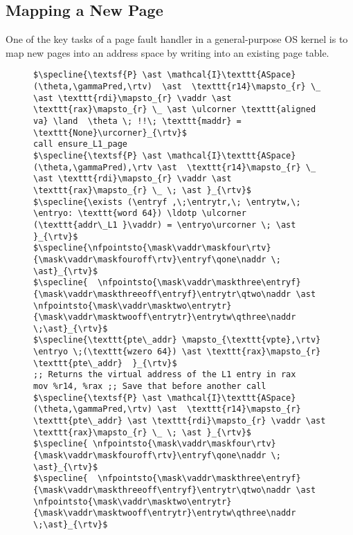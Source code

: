 \subsection{Mapping a New Page}
One of the key tasks of a page fault handler in a general-purpose OS kernel is to map new pages into an address space by writing into an existing page table.
\newcommand{\fpaddr}{\texttt{fpaddr}}
\newcommand{\specline}[1]{{\color{blue}\left\{#1\right\}}}
\begin{figure}\footnotesize
  \begin{lstlisting}
$\specline{\textsf{P} \ast \mathcal{I}\texttt{ASpace}(\theta,\gammaPred,\rtv)  \ast  \texttt{r14}\mapsto_{r} \_ \ast \texttt{rdi}\mapsto_{r} \vaddr \ast \texttt{rax}\mapsto_{r} \_ \ast \ulcorner \texttt{aligned va} \land  \theta \; !!\; \texttt{maddr} = \texttt{None}\urcorner}_{\rtv}$
call ensure_L1_page
$\specline{\textsf{P} \ast \mathcal{I}\texttt{ASpace}(\theta,\gammaPred),\rtv \ast  \texttt{r14}\mapsto_{r} \_ \ast \texttt{rdi}\mapsto_{r} \vaddr \ast \texttt{rax}\mapsto_{r} \_ \; \ast }_{\rtv}$
$\specline{\exists (\entryf ,\;\entrytr,\; \entrytw,\; \entryo: \texttt{word 64}) \ldotp \ulcorner (\texttt{addr\_L1 }\vaddr) = \entryo\urcorner \; \ast }_{\rtv}$
$\specline{\nfpointsto{\mask\vaddr\maskfour\rtv}{\mask\vaddr\maskfouroff\rtv}\entryf\qone\naddr \; \ast}_{\rtv}$ 
$\specline{  \nfpointsto{\mask\vaddr\maskthree\entryf}{\mask\vaddr\maskthreeoff\entryf}\entrytr\qtwo\naddr \ast \nfpointsto{\mask\vaddr\masktwo\entrytr}{\mask\vaddr\masktwooff\entrytr}\entrytw\qthree\naddr \;\ast}_{\rtv}$
$\specline{\texttt{pte\_addr} \mapsto_{\texttt{vpte},\rtv} \entryo \;(\texttt{wzero 64}) \ast \texttt{rax}\mapsto_{r} \texttt{pte\_addr}  }_{\rtv}$
;; Returns the virtual address of the L1 entry in rax
mov %r14, %rax ;; Save that before another call
$\specline{\textsf{P} \ast \mathcal{I}\texttt{ASpace}(\theta,\gammaPred,\rtv) \ast  \texttt{r14}\mapsto_{r} \texttt{pte\_addr} \ast \texttt{rdi}\mapsto_{r} \vaddr \ast \texttt{rax}\mapsto_{r} \_ \; \ast }_{\rtv}$
$\specline{ \nfpointsto{\mask\vaddr\maskfour\rtv}{\mask\vaddr\maskfouroff\rtv}\entryf\qone\naddr \; \ast}_{\rtv}$ 
$\specline{  \nfpointsto{\mask\vaddr\maskthree\entryf}{\mask\vaddr\maskthreeoff\entryf}\entrytr\qtwo\naddr \ast \nfpointsto{\mask\vaddr\masktwo\entrytr}{\mask\vaddr\masktwooff\entrytr}\entrytw\qthree\naddr \;\ast}_{\rtv}$

\end{lstlisting}
\end{figure}

